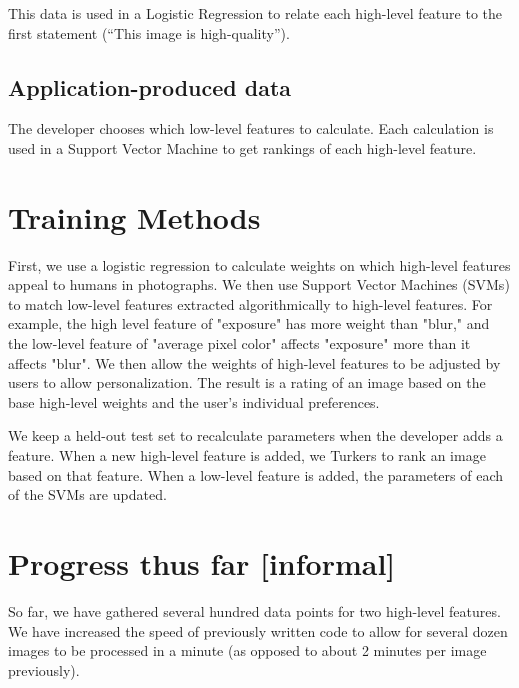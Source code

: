 \documentclass[10pt,twocolumn]{article}
\begin{document}


This data is used in a Logistic Regression to relate each high-level feature to the first statement (``This image is high-quality'').

\subsection{Application-produced data}
The developer chooses which low-level features to calculate. Each calculation is used in a Support Vector Machine to get rankings of each high-level feature.

\section{Training Methods}
\label{methods}

First, we use a logistic regression to calculate weights on which high-level features appeal to humans in photographs. We then use Support Vector Machines (SVMs) to match low-level features extracted algorithmically to high-level features. For example, the high level feature of "exposure" has more weight than "blur," and the low-level feature of "average pixel color" affects "exposure" more than it affects "blur". We then allow the weights of high-level features to be adjusted by users to allow personalization. The result is a rating of an image based on the base high-level weights and the user's individual preferences.

We keep a held-out test set to recalculate parameters when the developer adds a feature. When a new high-level feature is added, we Turkers to rank an image based on that feature. When a low-level feature is added, the parameters of each of the SVMs are updated.


\section{Progress thus far [informal]}
So far, we have gathered several hundred data points for two high-level features. We have increased the speed of previously written code to allow for several dozen images to be processed in a minute (as opposed to about 2 minutes per image previously).
\end{document}
